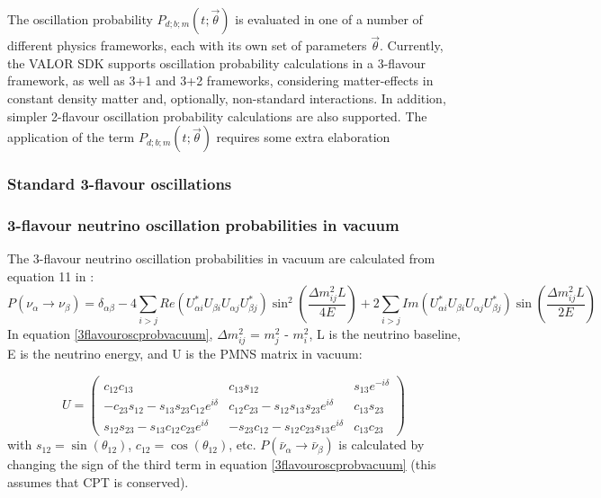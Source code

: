 The oscillation probability $P_{d;b;m}(t; \vec{\theta})$ is evaluated in one
of a number of different physics frameworks, each with its own set of parameters $\vec{\theta}$. Currently, the VALOR SDK supports oscillation probability calculations 
in a 3-flavour framework, as well as 3+1 and 3+2 frameworks, considering matter-effects 
in constant density matter and, optionally, non-standard interactions. 
In addition, simpler 2-flavour oscillation probability calculations are also supported.
The application of the term $P_{d;b;m}(t; \vec{\theta})$ requires some extra elaboration

%
%
%

\subsubsection{Standard 3-flavour oscillations}
\label{sec:3fosc}

%
%
\subsubsection*{3-flavour neutrino oscillation probabilities in vacuum}
 
The 3-flavour neutrino oscillation probabilities in vacuum are calculated from equation 11 in \cite{kayser2005}:
\begin{equation}
P(\nu_{\alpha} \rightarrow \nu_{\beta}) = \delta_{\alpha \beta} - 4 \sum_{i>j} Re(U_{\alpha i}^{*} U_{\beta i} U_{\alpha j} U_{\beta j}^{*})
\sin^{2} \left( \frac{\Delta m_{ij}^{2} L}{4E} \right) + 2 \sum_{i>j} Im(U_{\alpha i}^{*} U_{\beta i} U_{\alpha j} U_{\beta j}^{*})
\sin \left(\frac{\Delta m_{ij}^{2} L}{2E} \right)
\label{3flavouroscprobvacuum}
\end{equation}
In equation \ref{3flavouroscprobvacuum}, $\Delta m_{ij}^{2}$ = $m_{j}^{2}$ - $m_{i}^{2}$, L is the neutrino baseline, E is the neutrino energy, and U is the PMNS matrix in vacuum:

\begin{equation}
U = \left(
\begin{array}{ccc}
c_{12}c_{13} & c_{13}s_{12} & s_{13}e^{-i\delta} \\
-c_{23}s_{12} - s_{13}s_{23}c_{12}e^{i\delta} & c_{12}c_{23} - s_{12}s_{13}s_{23}e^{i\delta} & c_{13}s_{23} \\
s_{12}s_{23} - s_{13}c_{12}c_{23}e^{i\delta} & -s_{23}c_{12} - s_{12}c_{23}s_{13}e^{i\delta} & c_{13}c_{23}
\end{array} \right)
\label{PMNSmatrix}
\end{equation}
with $s_{12} = \sin(\theta_{12})$, $c_{12} = \cos(\theta_{12})$, etc. $P(\bar{\nu}_{\alpha} \rightarrow \bar{\nu}_{\beta})$
is calculated by changing the sign of the third term in equation \ref{3flavouroscprobvacuum} (this assumes that CPT is
conserved).


